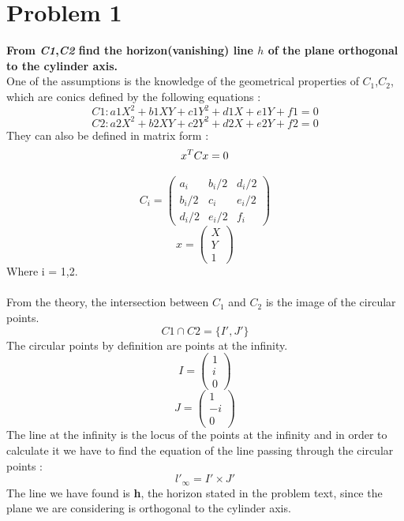 \documentclass[a4paper, 11pt, oneside, openright, english]{book}
\begin{document}
\section{Problem 1}
\textbf{From \textit{C1},\textit{C2} find the horizon(vanishing) line \textit{$h$} of the plane orthogonal to the cylinder axis.}\\
One of the assumptions is the knowledge of the geometrical properties of $C_1$,$C_2$, which are conics defined by the following equations : \\
\begin{equation}
    C1 : a1X^2 + b1XY + c1Y^2 + d1X + e1Y + f1 = 0
\end{equation}
\begin{equation}
    C2 : a2X^2 + b2XY + c2Y^2 + d2X + e2Y + f2 = 0
\end{equation}
They can also be defined in matrix form : \\
\begin{equation}
    x^TCx = 0 \\
\end{equation}

\[
    C_i = 
\begin{pmatrix}
    a_i & b_i/2 & d_i/2 \\
    b_i/2 & c_i & e_i/2 \\
    d_i/2 & e_i/2 & f_i 
\end{pmatrix}
\]
\[
    x = 
\begin{pmatrix}
    X \\
    Y \\
    1
\end{pmatrix}
\]
Where i = 1,2.\\
\\From the theory, the intersection between $C_1$ and $C_2$ is the image of the circular points. \\
\begin{equation}
        C1 \cap  C2 = \{ I', J'\} \label{eq:IJ}
\end{equation}
The circular points by definition are points at the infinity. \\
\[
    I =  
\begin{pmatrix}
    1 \\
    i \\
    0
\end{pmatrix}    
\]
\[
    J =  
\begin{pmatrix}
    1 \\
    -i \\
    0
\end{pmatrix}    
\]
The line at the infinity is the locus of the points at the infinity and 
in order to calculate it we have to find the equation of the line passing through the circular points :
\begin{equation}
    l'_\infty = I' \times J' 
\end{equation}    
The line we have found is \textbf{h}, the horizon stated in the problem text, since the plane we are considering is orthogonal to the cylinder axis.
\end{document}
